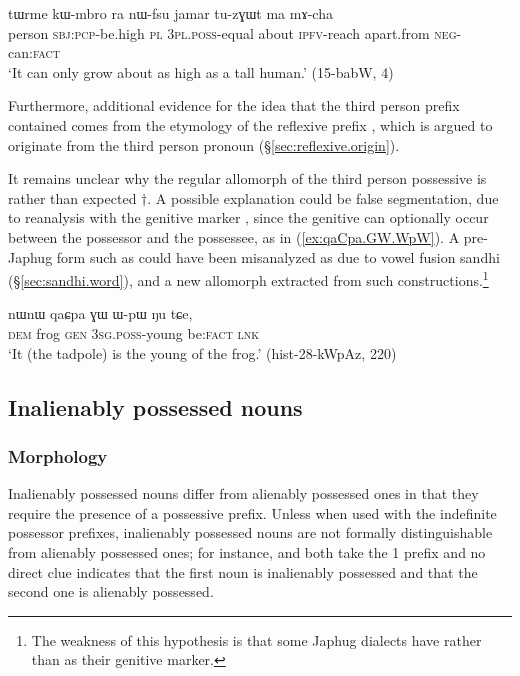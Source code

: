 \begin{exe}
\ex \label{ex:nWfsu}
\gll tɯrme kɯ-mbro ra nɯ-fsu jamar tu-zɣɯt ma mɤ-cha \\
person \textsc{sbj}:\textsc{pcp}-be.high \textsc{pl}  \textsc{3pl}.\textsc{poss}-equal about \textsc{ipfv}-reach apart.from \textsc{neg}-can:\textsc{fact} \\
\glt `It can only grow about as high as a tall human.' (15-babW, 4)
\end{exe}

Furthermore, additional evidence for the idea that the third person prefix contained  comes from the etymology of the reflexive prefix , which is argued to originate from the third person pronoun (§\ref{sec:reflexive.origin}).

It remains unclear why the regular allomorph of the third person possessive is  rather than expected $\dagger$. A possible explanation could be false segmentation, due to reanalysis with the genitive marker , since the genitive can optionally occur between the possessor and the possessee, as in (\ref{ex:qaCpa.GW.WpW}). A pre-Japhug form such as  could have been misanalyzed as  due to vowel fusion sandhi (§\ref{sec:sandhi.word}), and a new allomorph  extracted from such constructions.\footnote{The weakness of this hypothesis is that some Japhug dialects have  rather than  as their genitive marker.}

\begin{exe}
\ex \label{ex:qaCpa.GW.WpW}
 \gll nɯnɯ qaɕpa ɣɯ ɯ-pɯ ŋu tɕe, \\
 \textsc{dem} frog \textsc{gen} \textsc{3sg}.\textsc{poss}-young be:\textsc{fact} \textsc{lnk} \\
 \glt `It (the tadpole) is the young of the frog.' (hist-28-kWpAz, 220)
\end{exe} 


\subsection{Inalienably possessed nouns} \label{sec:inalienably.possessed}

\subsubsection{Morphology} \label{sec:inalienably.possessed.morpho}
Inalienably possessed nouns differ from alienably possessed ones in that they require the presence of a possessive prefix.  Unless when used with the indefinite possessor prefixes, inalienably possessed nouns are not formally distinguishable from alienably possessed ones; for instance,  and  both take the 1\sg{}  prefix and no direct clue indicates that the first noun is inalienably possessed and that the second one is alienably possessed.

